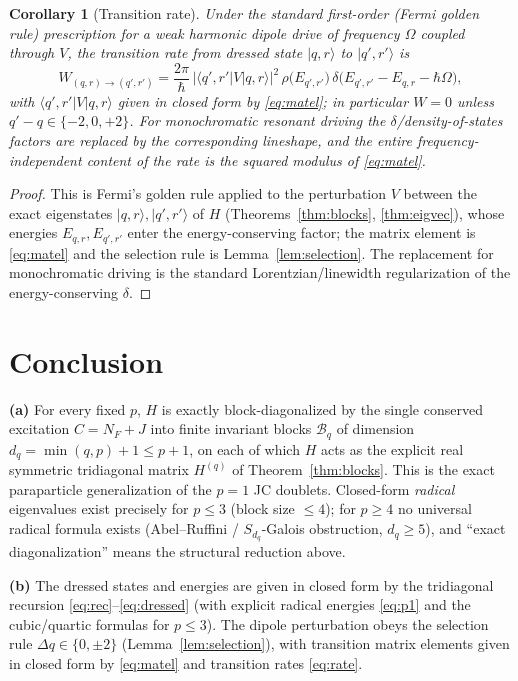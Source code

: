 \documentclass[12pt]{article}
\newtheorem{corollary}{Corollary}
\theoremstyle{definition}
\theoremstyle{remark}
\newcommand{\ket}[1]{\lvert #1\rangle}
\newcommand{\bra}[1]{\langle #1\rvert}
\begin{document}
\begin{corollary}[Transition rate]\label{cor:rate}
Under the standard first-order (Fermi golden rule) prescription for a weak
harmonic dipole drive of frequency $\Omega$ coupled through $V$, the transition rate
from dressed state $\ket{q,r}$ to $\ket{q',r'}$ is
\begin{equation}\label{eq:rate}
W_{(q,r)\to(q',r')}
=\frac{2\pi}{\hbar}\,\bigl|\bra{q',r'}V\ket{q,r}\bigr|^2\,
\rho\bigl(E_{q',r'}\bigr)\,\delta\!\bigl(E_{q',r'}-E_{q,r}-\hbar\Omega\bigr),
\end{equation}
with $\bra{q',r'}V\ket{q,r}$ given in closed form by \eqref{eq:matel}; in particular
$W=0$ unless $q'-q\in\{-2,0,+2\}$. For monochromatic resonant driving the
$\delta$/density-of-states factors are replaced by the corresponding lineshape, and
the entire frequency-independent content of the rate is the squared modulus of
\eqref{eq:matel}.
\end{corollary}

\begin{proof}
This is Fermi's golden rule applied to the perturbation $V$ between the exact
eigenstates $\ket{q,r},\ket{q',r'}$ of $H$ (Theorems~\ref{thm:blocks},
\ref{thm:eigvec}), whose energies $E_{q,r},E_{q',r'}$ enter the energy-conserving
factor; the matrix element is \eqref{eq:matel} and the selection rule is
Lemma~\ref{lem:selection}. The replacement for monochromatic driving is the standard
Lorentzian/linewidth regularization of the energy-conserving $\delta$.
\end{proof}

\section{Conclusion}

\textbf{(a)} For every fixed $p$, $H$ is exactly block-diagonalized by the single
conserved excitation $C=N_F+J$ into finite invariant blocks $\mathcal B_q$ of
dimension $d_q=\min(q,p)+1\le p+1$, on each of which $H$ acts as the explicit real
symmetric tridiagonal matrix $H^{(q)}$ of Theorem~\ref{thm:blocks}. This is the
exact paraparticle generalization of the $p=1$ JC doublets. Closed-form
\emph{radical} eigenvalues exist precisely for $p\le3$ (block size $\le4$); for
$p\ge4$ no universal radical formula exists (Abel--Ruffini /
$S_{d_q}$-Galois obstruction, $d_q\ge5$), and ``exact diagonalization'' means the
structural reduction above.

\textbf{(b)} The dressed states and energies are given in closed form by the
tridiagonal recursion \eqref{eq:rec}--\eqref{eq:dressed} (with explicit radical
energies \eqref{eq:p1} and the cubic/quartic formulas for $p\le3$). The dipole
perturbation obeys the selection rule $\Delta q\in\{0,\pm2\}$
(Lemma~\ref{lem:selection}), with transition matrix elements given in closed form by
\eqref{eq:matel} and transition rates \eqref{eq:rate}.
\end{document}
